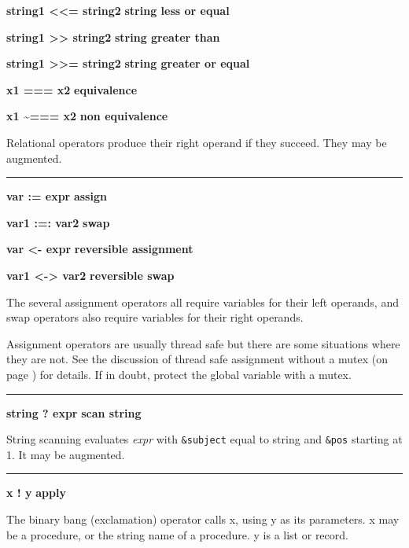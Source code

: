 \noindent
{\bf string1 {\textless}{\textless}= string2 } \hfill {\bf string less or equal}

\noindent
{\bf string1 {\textgreater}{\textgreater} string2 } \hfill {\bf string greater than}

\noindent
{\bf string1 {\textgreater}{\textgreater}= string2 } \hfill {\bf string greater or equal}

\noindent
{\bf x1 === x2 } \hfill {\bf equivalence}

\noindent
{\bf x1 \~{}=== x2 } \hfill {\bf non equivalence}

\noindent
Relational operators produce their right operand if they succeed. They
may be augmented.

\bigskip\hrule\vspace{0.1cm}

\noindent
{\bf var := expr } \hfill {\bf assign}

\noindent
{\bf var1 :=: var2 } \hfill {\bf swap}\WarningNotThreadSafe
{}

\noindent
{\bf var {\textless}- expr } \hfill {\bf reversible assignment}

\noindent
{\bf var1 {\textless}-{\textgreater} var2 } \hfill {\bf reversible swap}\WarningNotThreadSafe
{}

\noindent
The several assignment
operators all require variables for their left operands, and swap
operators also require variables for their right operands.

Assignment operators are usually thread safe \ConcurrencyIssue
but there are some situations where they are not. 
See the discussion of thread safe assignment without a mutex (on page
\pageref{ThreadSafeAssignment}) for details. If in doubt, protect the
global variable with a mutex.

\bigskip\hrule\vspace{0.1cm}
\noindent
{\bf string ? expr } \hfill {\bf scan string}

\noindent
{}String scanning evaluates \textit{expr}
with \texttt{\&subject} equal to string and \texttt{\&pos} starting at
1. It may be augmented.

\bigskip\hrule\vspace{0.1cm}
\noindent
{\bf x ! y } \hfill {\bf apply}

\noindent
{}The binary bang (exclamation) operator calls x,
using y as its parameters.  x may be a procedure, or the string name of
a procedure.  y is a list or record.

